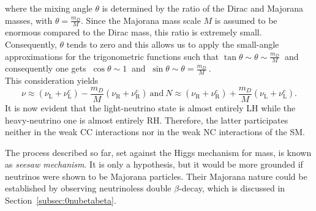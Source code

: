 where the mixing angle $\theta$ is determined by the ratio of the Dirac and Majorana masses, with $\theta = \frac{m_D}{M}$. 
Since the Majorana mass scale $M$ is assumed to be enormous compared to the Dirac mass, this ratio is extremely small. 
Consequently, $\theta$ tends to zero and this allows us to apply the small-angle approximations for the trigonometric functions such that
$\tan\theta \sim \theta \sim \frac{m_D}{M}~$ and consequently one gets $~\cos\theta \sim 1~$ and $~\sin\theta \sim \theta = \frac{m_D}{M}~$.\\
This consideration yields
\begin{equation*}
    \nu \approx (\nu_\text{L} + \nu_\text{L}^c) - \frac{m_D}{M}(\nu_\text{R} + \nu_\text{R}^c) ~ \text{and} ~ N \approx (\nu_\text{R} + \nu_\text{R}^c) + \frac{m_D}{M}(\nu_\text{L} + \nu_\text{L}^c).
\end{equation*}
It is now evident that the light-neutrino state is almost entirely \ac{LH} while the heavy-neutrino one is almost entirely \ac{RH}. 
Therefore, the latter participates neither in the weak \ac{CC} interactions nor in the weak \ac{NC} interactions of the \ac{SM}.

The process described so far, set against the Higgs mechanism for mass, is known as \textit{seesaw mechanism}.
It is only a hypothesis, but it would be more grounded if neutrinos were shown to be Majorana particles.
Their Majorana nature could be established by observing neutrinoless double $\beta$-decay, which is discussed in Section~\ref{subsec:0nubetabeta}.

